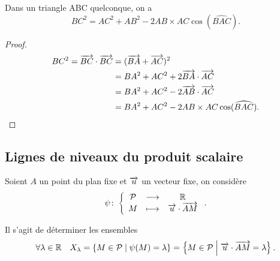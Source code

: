 \begin{prop}
    Dans un triangle ABC quelconque, on a 
    \begin{equation}
        BC^2 = AC^2 + AB^2 - 2 AB \times AC \cos(\widehat{BAC}).
    \end{equation}
\end{prop}

\begin{proof}
    \begin{align*}
        BC^2 = \overrightarrow{BC} \cdot \overrightarrow{BC}& =(\overrightarrow{BA} + \overrightarrow{AC})^2 \\
                                      & = BA^2 + AC^2 +2 \overrightarrow{BA} \cdot 
                                      \overrightarrow{AC}\\
                                      & = BA^2 + AC^2 -2 \overrightarrow{AB} \cdot 
        \overrightarrow{AC}\\ & = BA^2 + AC^2 -2 AB \times AC \cos(\widehat{BAC}).
    \end{align*}
\end{proof}

\subsection{Lignes de niveaux du produit scalaire}
Soient \(A\) un point du plan fixe et \(\overrightarrow{u}\) un vecteur fixe, on considère
\begin{equation}
    \psi\colon \left\{\begin{array}{ccc} \mathcal{P} & \longrightarrow &\mathbb{R}\\ M & \longmapsto & \overrightarrow{u}\cdot\overrightarrow{AM} \end{array} \right..
\end{equation}

Il s'agit de déterminer les ensembles
\begin{equation}
    \forall \lambda \in \mathbb{R} \quad  X_\lambda = \left\{M \in \mathcal{P}\mathrel{}\middle|\mathrel{}\psi(M) = 
    \lambda\right\} = \left\{M \in \mathcal{P}\mathrel{}\middle|\mathrel{}\overrightarrow{u} \cdot \overrightarrow{AM} = \lambda\right\}.
\end{equation}

